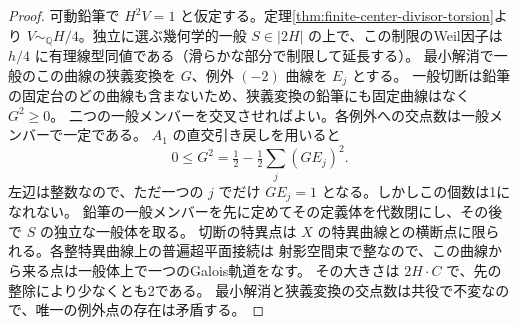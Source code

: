 \begin{proof}
可動鉛筆で $H^2V=1$ と仮定する。定理\ref{thm:finite-center-divisor-torsion}より
$V\sim_{\mathbb Q}H/4$。独立に選ぶ幾何学的一般 $S\in|2H|$ の上で、この制限のWeil因子は
$h/4$ に有理線型同値である（滑らかな部分で制限して延長する）。
最小解消で一般のこの曲線の狭義変換を $G$、例外 $(-2)$ 曲線を $E_j$ とする。
一般切断は鉛筆の固定台のどの曲線も含まないため、狭義変換の鉛筆にも固定曲線はなく $G^2\ge0$。
二つの一般メンバーを交叉させればよい。各例外への交点数は一般メンバーで一定である。
$A_1$ の直交引き戻しを用いると
\[
             0\le G^2=\tfrac12-\tfrac12\sum_j(GE_j)^2 .
\]
左辺は整数なので、ただ一つの $j$ でだけ $GE_j=1$ となる。しかしこの個数は1になれない。
鉛筆の一般メンバーを先に定めてその定義体を代数閉にし、その後で $S$ の独立な一般体を取る。
切断の特異点は $X$ の特異曲線との横断点に限られる。各整特異曲線上の普遍超平面接続は
射影空間束で整なので、この曲線から来る点は一般体上で一つのGalois軌道をなす。
その大きさは $2H\cdot C$ で、先の整除により少なくとも2である。
最小解消と狭義変換の交点数は共役で不変なので、唯一の例外点の存在は矛盾する。
\end{proof}

